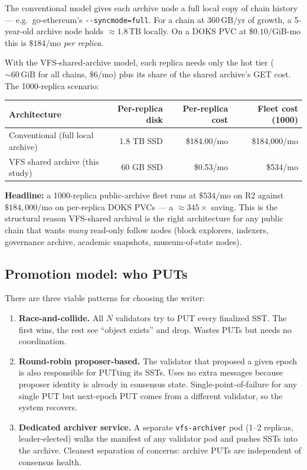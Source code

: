 \documentclass[11pt,a4paper]{article}
\begin{document}
The conventional model gives each archive node a full local copy of
chain history --- e.g.\ go-ethereum's \verb|--syncmode=full|. For a
chain at $360\,\text{GB}/\text{yr}$ of growth, a 5-year-old archive
node holds $\approx 1.8\,\text{TB}$ locally. On a DOKS PVC at
$\$0.10/\text{GiB-mo}$ this is $\$184/\text{mo}$ \emph{per replica}.

With the VFS-shared-archive model, each replica needs only the hot tier
($\sim 60\,\text{GiB}$ for all chains, $\$6/\text{mo}$) plus its share
of the shared archive's GET cost. The 1000-replica scenario:

\begin{tabularx}{\linewidth}{lrrr}
\toprule
\textbf{Architecture} &
\textbf{Per-replica disk} &
\textbf{Per-replica cost} &
\textbf{Fleet cost (1000)} \\
\midrule
Conventional (full local archive)   & 1.8 TB SSD & \$184.00/mo & \$184,000/mo \\
VFS shared archive (this study)     &  60 GB SSD &   \$0.53/mo &     \$534/mo \\
\bottomrule
\end{tabularx}

\noindent
\textbf{Headline:} a 1000-replica public-archive fleet runs at
$\$534/\text{mo}$ on R2 against $\$184{,}000/\text{mo}$ on per-replica
DOKS PVCs --- a $\approx 345\times$ saving. This is the structural
reason VFS-shared archival is the right architecture for any public
chain that wants \emph{many} read-only follow nodes (block
explorers, indexers, governance archive, academic snapshots,
museum-of-state nodes).

\subsection{Promotion model: who PUTs}

There are three viable patterns for choosing the writer:

\begin{enumerate}
  \item \textbf{Race-and-collide.} All $N$ validators try to PUT every
    finalized SST. The first wins, the rest see ``object exists'' and
    drop. Wastes PUTs but needs no coordination.
  \item \textbf{Round-robin proposer-based.} The validator that
    proposed a given epoch is also responsible for PUTting its SSTs.
    Uses no extra messages because proposer identity is already in
    consensus state. Single-point-of-failure for any single PUT but
    next-epoch PUT comes from a different validator, so the system
    recovers.
  \item \textbf{Dedicated archiver service.} A separate
    \texttt{vfs-archiver} pod (1--2 replicas, leader-elected) walks the
    manifest of any validator pod and pushes SSTs into the archive.
    Cleanest separation of concerns: archive PUTs are independent of
    consensus health.
\end{enumerate}
\end{document}
